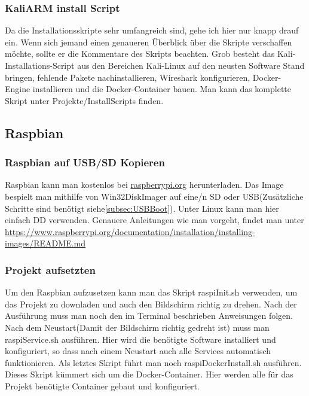 \subsubsection{KaliARM install Script}
Da die Installationsskripte sehr umfangreich sind, gehe ich hier nur knapp drauf ein. Wenn sich jemand einen genaueren Überblick über die Skripte verschaffen möchte, sollte er die Kommentare des Skripts beachten. Grob besteht das Kali-Installations-Script aus den Bereichen Kali-Linux auf den neusten Software Stand bringen, fehlende Pakete nachinstallieren, Wireshark konfigurieren, Docker-Engine installieren und die Docker-Container bauen. Man kann das komplette Skript unter Projekte/InstallScripts finden.

\subsection{Raspbian}
\label{sc:installRaspbian}
\subsubsection{Raspbian auf USB/SD Kopieren}
Raspbian kann man kostenlos bei \href{https://www.raspberrypi.org/downloads/}{raspberrypi.org} herunterladen. 
Das Image bespielt man mithilfe von Win32DiskImager auf eine/n SD oder USB(Zusätzliche Schritte sind benötigt siehe\ref{subsec:USBBoot}). Unter Linux kann man hier einfach DD verwenden. Genauere Anleitungen wie man vorgeht, findet man unter \href{https://www.raspberrypi.org/documentation/installation/installing-images/README.md}{https://www.raspberrypi.org/documentation/installation/installing-images/README.md}
\subsubsection{Projekt aufsetzten}
Um den Raspbian aufzusetzen kann man das Skript raspiInit.sh verwenden, um das Projekt zu downladen und auch den Bildschirm richtig zu drehen. Nach der Ausführung muss man noch den im Terminal beschrieben Anweisungen folgen. Nach dem Neustart(Damit der Bildschirm richtig gedreht ist) muss man raspiService.sh ausführen. Hier wird die benötigte Software installiert und konfiguriert, so dass nach einem Neustart auch alle Services automatisch funktionieren. Als letztes Skript führt man noch raspiDockerInstall.sh ausführen. Dieses Skript kümmert sich um die Docker-Container. Hier werden alle für das Projekt benötigte Container gebaut und konfiguriert.

